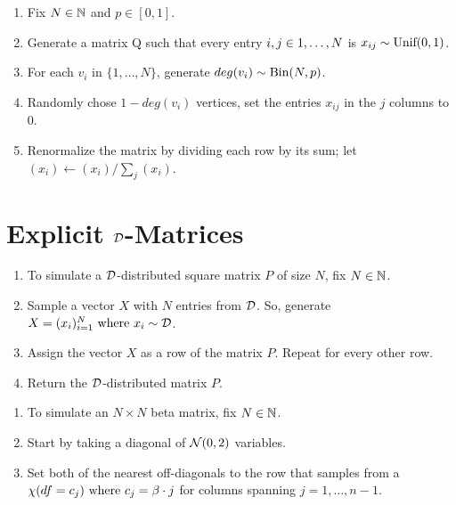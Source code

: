\begin{algorithm} \hfill
\begin{enumerate}
	\item{Fix $N \in \N$ and $p \in [0,1]$}.
	\item{Generate a matrix Q such that every entry $i,j\in \oneto[N]$ is $x_{ij} \sim \Unif(0,1)$.}
	\item{For each $v_i$ in $\{1,\dots,N\}$, generate $deg(v_i) \sim \Bin(N,p)$.}
	\item{Randomly chose $1-deg(v_i)$ vertices, set the entries $x_{ij}$ in the $j$ columns to 0.}
	\item{Renormalize the matrix by dividing each row by its sum; let $(x_i) \leftarrow (x_i)/\sum_j(x_i)$}.
\end{enumerate}
\end{algorithm}


\section{Explicit $\D$-Matrices}

\begin{algorithm} \hfill
\begin{enumerate}
	\item To simulate a $\D$-distributed square matrix $P$ of size $N$, fix $N \in \N$.
	\item Sample a vector $X$ with $N$ entries from $\D$. So, generate $X = (x_i)_{i = 1}^N \where x_i \sim \D$.
	\item Assign the vector $X$ as a row of the matrix $P$. Repeat for every other row.
	\item Return the $\D$-distributed matrix $P$.
\end{enumerate}
\end{algorithm}

\begin{algorithm} \hfill
  \begin{enumerate}
    \item To simulate an $N \times N$ beta matrix, fix $N \in \N$.
    \item Start by taking a diagonal of $\Normal(0,2)$ variables.
    \item Set both of the nearest off-diagonals to the row that samples from a $\chi(df = c_j) \where c_j = \beta \cdot j$ for columns spanning $j = 1,\dots,n-1$.
  \end{enumerate}
\end{algorithm}

